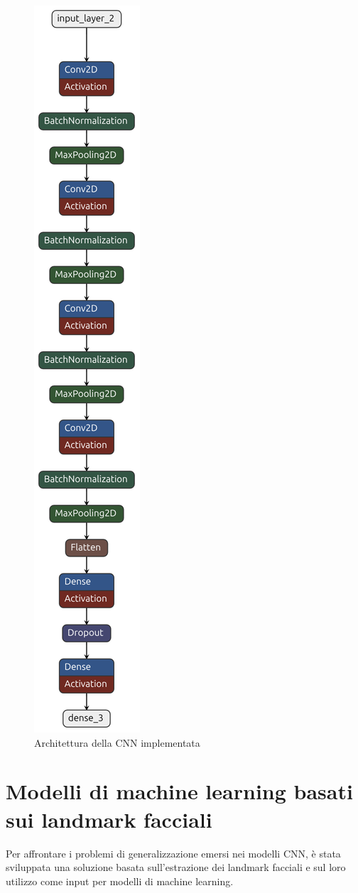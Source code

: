 \documentclass[12pt,a4paper,openright,twoside]{book}
\begin{document}
\begin{figure}
    \centering
    \includegraphics[width=.2\linewidth]{figures/custom-CNN-architecture}
    \caption{Architettura della CNN implementata}
    \label{fig:custom_CNN_architecture}
\end{figure}

\section{Modelli di machine learning basati sui landmark facciali}
\label{chap:landmark_based_model}

Per affrontare i problemi di generalizzazione emersi nei modelli CNN, è stata sviluppata una soluzione basata sull'estrazione dei landmark facciali e sul loro utilizzo come input per modelli di machine learning.  
\end{document}
